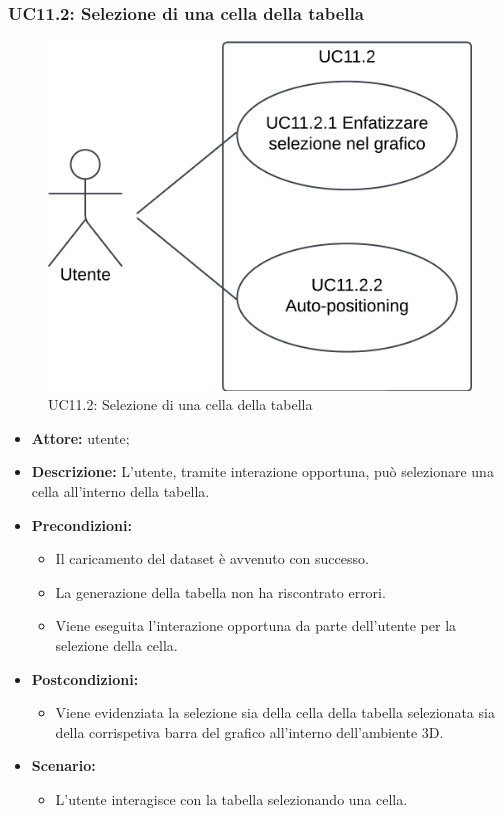 \subsubsection{UC11.2: Selezione di una cella della tabella}
\begin{figure}[h!]\centering
    \includegraphics[scale=0.7]{template/images/UC11.2.png}
    \caption{UC11.2: Selezione di una cella della tabella}
\end{figure}
\begin{itemize}    
    \item \textbf{Attore:} utente;
    \item \textbf{Descrizione:} L'utente, tramite interazione opportuna, può selezionare una cella all'interno della tabella.
    \item \textbf{Precondizioni:}    
        \begin{itemize}
            \item Il caricamento del dataset è avvenuto con successo.
            \item La generazione della tabella non ha riscontrato errori.
            \item Viene eseguita l'interazione opportuna da parte dell'utente per la selezione della cella.
        \end{itemize}    
    \item \textbf{Postcondizioni:}
        \begin{itemize}
            \item Viene evidenziata la selezione sia della cella della tabella selezionata sia della corrispetiva barra del grafico all'interno dell'ambiente 3D.
        \end{itemize}    
    \item \textbf{Scenario:} 
        \begin{itemize}
            \item L'utente interagisce con la tabella selezionando una cella.
        \end{itemize}
\end{itemize}
